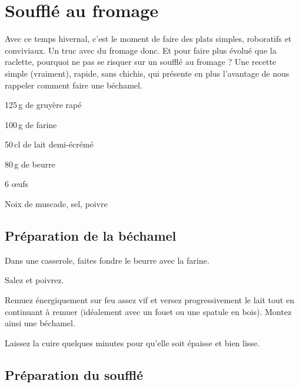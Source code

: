 \section{Soufflé au fromage}

Avec ce temps hivernal, c'est le moment de faire des plats simples, roboratifs
et conviviaux. Un truc avec du fromage donc. Et pour faire plus évolué que la
raclette, pourquoi ne pas se risquer sur un soufflé au fromage ?  Une recette
simple (vraiment), rapide, sans chichis, qui présente en plus l'avantage de
nous rappeler comment faire une béchamel.

\begin{ingredients}

	\item 125\,g de gruyère rapé
	\item 100\,g de farine
	\item 50\,cl de lait demi-écrémé
	\item 80\,g de beurre
	\item 6 œufs
	\item Noix de muscade, sel, poivre

\end{ingredients}

\subsection*{Préparation de la béchamel}

\begin{instructions}

	\item Dans une casserole, faites fondre le beurre avec la farine.
	\item Salez et poivrez.
    \item Remuez énergiquement sur feu assez vif et versez progressivement le
    lait tout en continuant à remuer (idéalement avec un fouet ou une spatule
    en bois). Montez ainsi une béchamel.
	\item Laissez la cuire quelques minutes pour qu’elle soit épaisse et bien
	lisse.

\end{instructions}

\subsection*{Préparation du soufflé}

